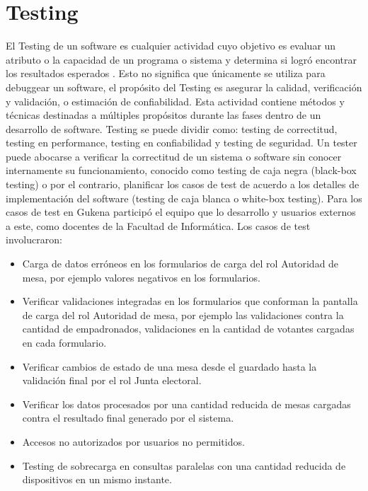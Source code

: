 \section{Testing}
El Testing de un software es cualquier actividad cuyo objetivo es evaluar un atributo o la capacidad de un programa o sistema y determina si logró encontrar los resultados esperados \cite{pan1999software}. Esto no significa que únicamente se utiliza para debuggear un software, el propósito del Testing es asegurar la calidad, verificación y validación, o estimación de confiabilidad. Esta actividad contiene métodos y técnicas destinadas a múltiples propósitos durante las fases dentro de un desarrollo de software. Testing se puede dividir como: testing de correctitud, testing en performance, testing en confiabilidad y testing de seguridad. Un tester puede abocarse a verificar la correctitud de un sistema o software sin conocer internamente su funcionamiento, conocido como testing de caja negra (black-box testing) o por el contrario, planificar los casos de test de acuerdo a los detalles de implementación del software (testing de caja blanca o white-box testing). \newline
Para los casos de test en Gukena participó el equipo que lo desarrollo y usuarios externos a este, como docentes de la Facultad de Informática. Los casos de test involucraron:
\begin{itemize}
    \item Carga de datos erróneos en los formularios de carga del rol Autoridad de mesa, por ejemplo valores negativos en los formularios.
    \item Verificar validaciones integradas en los formularios que conforman la pantalla de carga del rol Autoridad de mesa, por ejemplo las validaciones contra la cantidad de empadronados, validaciones en la cantidad de votantes cargadas en cada formulario.
    \item Verificar cambios de estado de una mesa desde el guardado hasta la validación final por el rol Junta electoral.
    \item Verificar los datos procesados por una cantidad reducida de mesas cargadas contra el resultado final generado por el sistema.
    \item Accesos no autorizados por usuarios no permitidos.
    \item Testing de sobrecarga en consultas paralelas con una cantidad reducida de dispositivos en un mismo instante.
\end{itemize}